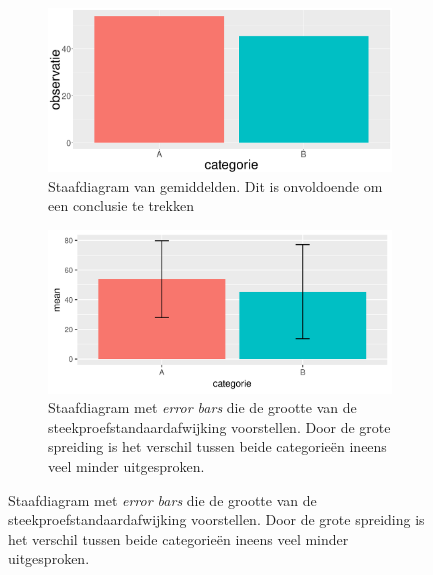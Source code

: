 \begin{figure}
  \begin{subfigure}{.5\textwidth}
    \includegraphics[width=\textwidth]{voorbeelden/barplot.png}
    \caption{Staafdiagram van gemiddelden. Dit is onvoldoende om een conclusie te trekken}
    \label{fig:barplot}
  \end{subfigure}
  \begin{subfigure}{.5\textwidth}
    \includegraphics[width=\textwidth]{voorbeelden/barplot-errorbars.png}
    \caption{Staafdiagram met \textit{error bars} die de grootte van de steekproefstandaardafwijking voorstellen. Door de grote spreiding is het verschil tussen beide categorieën ineens veel minder uitgesproken.}
    \label{fig:barplot-errorbars}
  \end{subfigure}
  

\end{figure}
